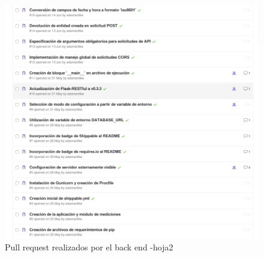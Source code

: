 \begin{figure}[h]
  \centering
  \includegraphics[width=.8\textwidth]{img/2-PR_Back}
  \caption{Pull request realizados por el back end -hoja2}
  \label{2-PR_Back}
\end{figure}

\clearpage
    

